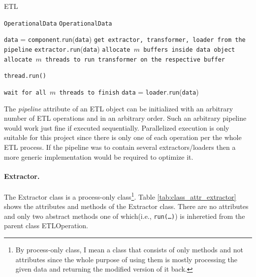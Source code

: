 \begin{algorithm}[H]
\caption{ETL}\label{alg:etl}
\begin{algorithmic}
\Require \texttt{OperationalData}
\Ensure \texttt{OperationalData}

		\State \texttt{data} = \texttt{component}.\texttt{run}(\texttt{data})
	\EndFor
\Else 	{}
	\State \texttt{get extractor, transformer, loader from the pipeline}
	\State \texttt{extractor.run}(\texttt{data})
	\State \texttt{allocate $m$ buffers inside data object}
	\State \texttt{allocate $m$ threads to run transformer on the respective buffer}

	\State \texttt{thread.run()}	
	\EndFor

	\State \texttt{wait for all $m$ threads to finish}
	\State \texttt{data} = \texttt{loader}.\texttt{run}(\texttt{data})
\EndIf
\EndWhile
\end{algorithmic}
\end{algorithm}

The \textit{pipeline} attribute of an ETL object can be initialized with an arbitrary number of 
ETL operations and in an arbitrary order. Such an arbitrary pipeline would work just fine if executed  
sequentially. Parallelized execution is only suitable for this project since there is only one of 
each operation per the whole ETL process. If the pipeline was to contain several extractors/loaders 
then a more generic implementation would be required to optimize it.

\paragraph{Extractor.}
The Extractor class is a process-only class\footnote{By process-only class, I mean a class that 
consists of only methods and not attributes since the whole purpose of using them is mostly 
processing the given data and returning the modified version of it back.}. Table 
\ref{tab:class_attr_extractor} shows the attributes and methods of the Extractor class. There are 
no attributes and only two abstract methods one of which(i.e., \texttt{run(\ldots)}) is inheretied 
from the parent class ETLOperation.


